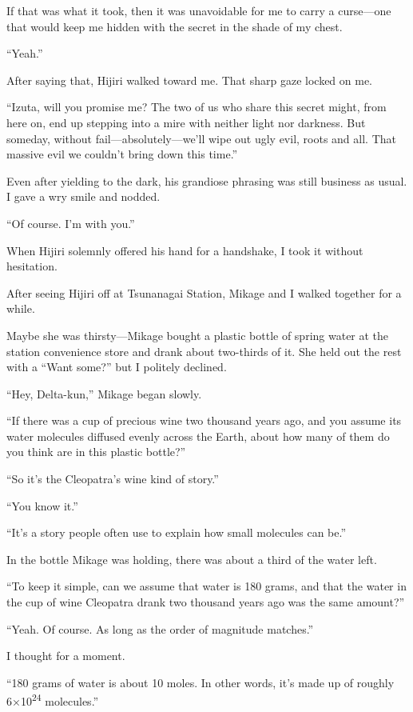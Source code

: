 \documentclass[
    a4paper,
    12pt,
    twoside,
    openany,
    UTF8,
    fontset=windows
]{ctexbook}
\begin{document}
If that was what it took, then it was unavoidable for me to carry a curse---one that would keep me hidden with the secret in the shade of my chest.

``Yeah.''

After saying that, Hijiri walked toward me. That sharp gaze locked on me.

``Izuta, will you promise me? The two of us who share this secret might, from here on, end up stepping into a mire with neither light nor darkness. But someday, without fail---absolutely---we'll wipe out ugly evil, roots and all. That massive evil we couldn't bring down this time.''

Even after yielding to the dark, his grandiose phrasing was still business as usual. I gave a wry smile and nodded.

``Of course. I'm with you.''

When Hijiri solemnly offered his hand for a handshake, I took it without hesitation.

After seeing Hijiri off at Tsunanagai Station, Mikage and I walked together for a while.

Maybe she was thirsty---Mikage bought a plastic bottle of spring water at the station convenience store and drank about two-thirds of it. She held out the rest with a ``Want some?'' but I politely declined.

``Hey, Delta-kun,'' Mikage began slowly.

``If there was a cup of precious wine two thousand years ago, and you assume its water molecules diffused evenly across the Earth, about how many of them do you think are in this plastic bottle?''

``So it's the Cleopatra's wine kind of story.''

``You know it.''

``It's a story people often use to explain how small molecules can be.''

In the bottle Mikage was holding, there was about a third of the water left.

``To keep it simple, can we assume that water is 180 grams, and that the water in the cup of wine Cleopatra drank two thousand years ago was the same amount?''

``Yeah. Of course. As long as the order of magnitude matches.''

I thought for a moment.

``180 grams of water is about 10 moles. In other words, it's made up of roughly 6×10\textsuperscript{24} molecules.''
\end{document}
